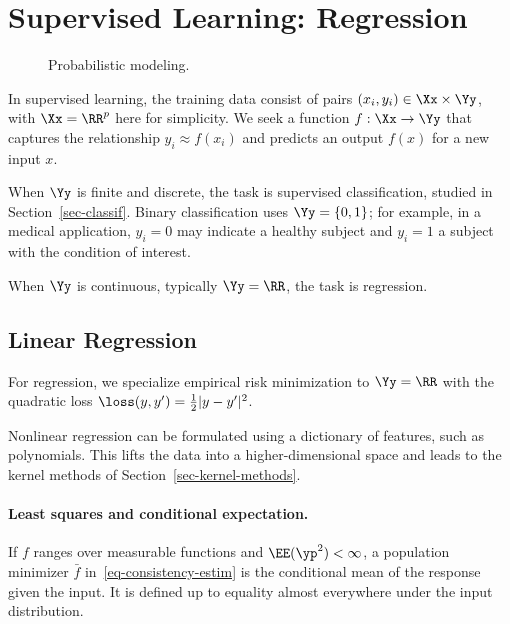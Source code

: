 \section{Supervised Learning: Regression}
\label{sec-regression}

\begin{figure}[tbp]
\centering
{}
\caption{Probabilistic modeling.}
\label{fig-review-ml-joint-model}
\end{figure}
In supervised learning, the training data consist of pairs $(x_i,y_i)\in\Xx\times\Yy$, with $\Xx=\RR^p$ here for simplicity. We seek a function $f:\Xx\rightarrow\Yy$ that captures the relationship $y_i\approx f(x_i)$ and predicts an output $f(x)$ for a new input $x$.

When $\Yy$ is finite and discrete, the task is supervised classification, studied in Section~\ref{sec-classif}. Binary classification uses $\Yy=\{0,1\}$; for example, in a medical application, $y_i=0$ may indicate a healthy subject and $y_i=1$ a subject with the condition of interest.
 
When $\Yy$ is continuous, typically $\Yy=\RR$, the task is regression.

                                                  
\subsection{Linear Regression}
\label{sec-linear-models}

For regression, we specialize empirical risk minimization to $\Yy=\RR$ with the quadratic loss $\loss(y,y')=\frac{1}{2}|y-y'|^2$.

Nonlinear regression can be formulated using a dictionary of features, such as polynomials. This lifts the data into a higher-dimensional space and leads to the kernel methods of Section~\ref{sec-kernel-methods}.

   
\paragraph{Least squares and conditional expectation.}

If $f$ ranges over measurable functions and $\EE(\yp^2)<\infty$, a population minimizer $\bar f$ in~\eqref{eq-consistency-estim} is the conditional mean of the response given the input. It is defined up to equality almost everywhere under the input distribution.
 
